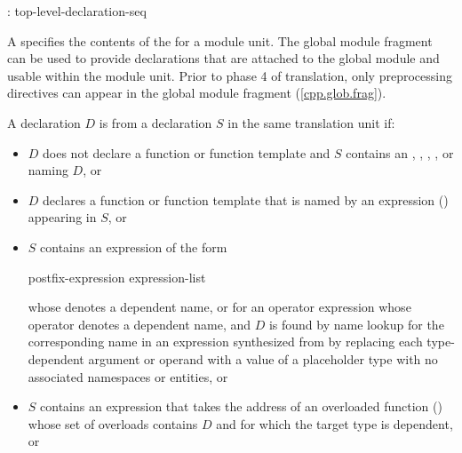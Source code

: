 \begin{std.txt}\color{addclr}
\begin{bnf}
:\br
     \terminal{;} top-level-declaration-seq\opt
\end{bnf}

\pnum
A  specifies the contents of the
 for a module unit.
The global module fragment can be used to provide declarations
that are attached to the global module and usable within the module unit.
\enternote
Prior to phase 4 of translation,
only preprocessing directives can appear
in the global module fragment (\ref{cpp.glob.frag}).
\exitnote

\pnum
A declaration $D$ is  from a declaration $S$
in the same translation unit if:
\begin{itemize}
\item
$D$ does not declare a function or function template and
$S$ contains an
,
,
,
, or
naming $D$, or

\item
$D$ declares a function or function template that
is named by an expression ()
appearing in $S$, or

\item
$S$ contains an expression  of the form

\begin{ncsimplebnf}
postfix-expression \terminal{(} expression-list\opt{} \terminal{)}
\end{ncsimplebnf}
whose  denotes a dependent name,
or for an operator expression whose operator denotes a dependent name,
and $D$ is found by name lookup for the corresponding name
in an expression synthesized from 
by replacing each type-dependent argument or operand
with a value of a placeholder type
with no associated namespaces or entities, or

\item
$S$ contains an expression that
takes the address of an overloaded function ()
whose set of overloads contains $D$ and
for which the target type is dependent, or


\end{itemize}
\end{std.txt}
